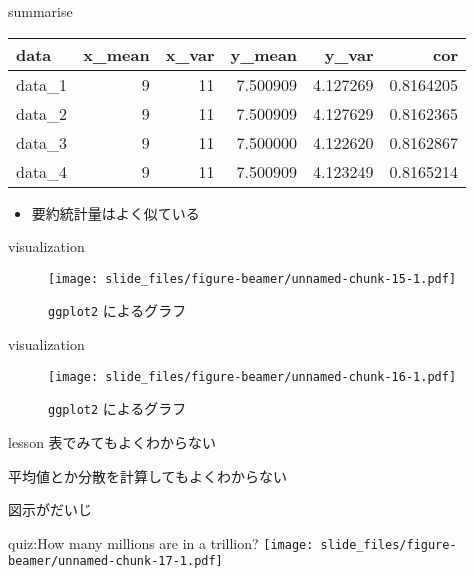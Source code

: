 \documentclass[
  ignorenonframetext,
]{beamer}
\providecommand{\tightlist}{%
  \setlength{\itemsep}{0pt}\setlength{\parskip}{0pt}}
\begin{document}
\begin{frame}{summarise}
\protect\hypertarget{summarise}{}
\begin{longtable}[]{@{}lrrrrr@{}}
\toprule()
data & x\_mean & x\_var & y\_mean & y\_var & cor \\
\midrule()
\endhead
data\_1 & 9 & 11 & 7.500909 & 4.127269 & 0.8164205 \\
data\_2 & 9 & 11 & 7.500909 & 4.127629 & 0.8162365 \\
data\_3 & 9 & 11 & 7.500000 & 4.122620 & 0.8162867 \\
data\_4 & 9 & 11 & 7.500909 & 4.123249 & 0.8165214 \\
\bottomrule()
\end{longtable}

\begin{itemize}
\tightlist
\item
  要約統計量はよく似ている
\end{itemize}
\end{frame}

\begin{frame}[fragile]{visualization}
\protect\hypertarget{visualization}{}
\begin{figure}
\centering
\texttt{[image: slide\_files/figure-beamer/unnamed-chunk-15-1.pdf]}
\caption{\texttt{ggplot2} によるグラフ}
\end{figure}
\end{frame}

\begin{frame}[fragile]{visualization}
\protect\hypertarget{visualization-1}{}
\begin{figure}
\centering
\texttt{[image: slide\_files/figure-beamer/unnamed-chunk-16-1.pdf]}
\caption{\texttt{ggplot2} によるグラフ}
\end{figure}
\end{frame}

\begin{frame}{lesson}
\protect\hypertarget{lesson}{}
表でみてもよくわからない

平均値とか分散を計算してもよくわからない

図示がだいじ
\end{frame}

\begin{frame}{quiz:How many millions are in a trillion?}
\protect\hypertarget{quizhow-many-millions-are-in-a-trillion}{}
\texttt{[image: slide\_files/figure-beamer/unnamed-chunk-17-1.pdf]}
\end{frame}
\end{document}
